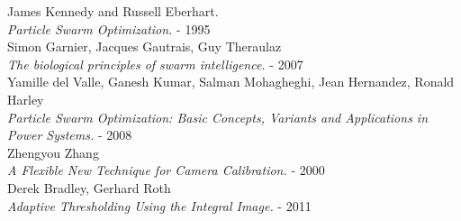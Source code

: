 \documentclass[journal]{IEEEtran}
\begin{document}
\begin{thebibliography}{1}

  James Kennedy and Russell Eberhart. \\
  \textit{Particle Swarm Optimization.} - 1995
\\
  Simon Garnier, Jacques Gautrais, Guy Theraulaz\\
  \textit{The biological principles of swarm intelligence.} - 2007
\\
  Yamille del Valle, Ganesh Kumar, Salman Mohagheghi, Jean Hernandez, Ronald Harley\\
  \textit{Particle Swarm Optimization: Basic Concepts, Variants and Applications in Power Systems.} - 2008
\\
  Zhengyou Zhang \\
  \textit{A Flexible New Technique for Camera Calibration.} - 2000
\\
  Derek Bradley, Gerhard Roth \\
  \textit{Adaptive Thresholding Using the Integral Image.} - 2011

\end{thebibliography}
\end{document}
